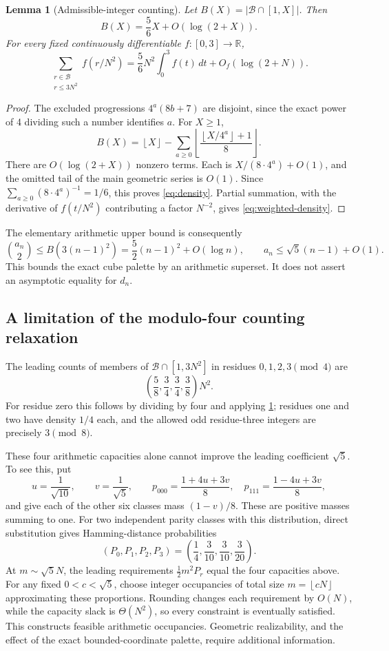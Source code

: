 \documentclass[11pt,letterpaper]{article}
\newtheorem{lemma}[theorem]{Lemma}
\theoremstyle{definition}
\newcommand{\RR}{\mathbb R}
\newcommand{\floor}[1]{\left\lfloor #1\right\rfloor}
\newcommand{\calB}{\mathcal B}
\begin{document}
\begin{lemma}[Admissible-integer counting]
\label{lem:count}
Let \(B(X)=|\calB\cap[1,X]|\). Then
\begin{equation}
 B(X)=\frac56X+O(\log(2+X)).
 \label{eq:density}
\end{equation}
For every fixed continuously differentiable \(f:[0,3]\to\RR\),
\begin{equation}
 \sum_{\substack{r\in\calB\\r\le3N^2}}f(r/N^2)
 =\frac56N^2\int_0^3f(t)\,dt+O_f(\log(2+N)).
 \label{eq:weighted-density}
\end{equation}
\end{lemma}
\begin{proof}
The excluded progressions \(4^a(8b+7)\) are disjoint, since the exact
power of 4 dividing such a number identifies \(a\). For \(X\ge1\),
\[
 B(X)=\floor X-
 \sum_{a\ge0}
 \floor{\frac{\floor{X/4^a}+1}{8}}.
\]
There are \(O(\log(2+X))\) nonzero terms. Each is
\(X/(8\cdot4^a)+O(1)\), and the omitted tail of the main geometric
series is \(O(1)\). Since
\(\sum_{a\ge0}(8\cdot4^a)^{-1}=1/6\), this proves
\cref{eq:density}. Partial summation, with the derivative of
\(f(t/N^2)\) contributing a factor \(N^{-2}\), gives
\cref{eq:weighted-density}.
\end{proof}

The elementary arithmetic upper bound is consequently
\[
 \binom{a_n}{2}\le B(3(n-1)^2)
 =\frac52(n-1)^2+O(\log n),
 \qquad a_n\le\sqrt5(n-1)+O(1).
\]
This bounds the exact cube palette by an arithmetic superset. It does
not assert an asymptotic equality for \(d_n\).

\subsection{A limitation of the modulo-four counting relaxation}
The leading counts of members of \(\calB\cap[1,3N^2]\) in residues
\(0,1,2,3\pmod4\) are
\[
 \left(\frac58,\frac34,\frac34,\frac38\right)N^2.
\]
For residue zero this follows by dividing by four and applying
\cref{lem:count}; residues one and two have density \(1/4\) each,
and the allowed odd residue-three integers are precisely \(3\pmod8\).

These four arithmetic capacities alone cannot improve the leading
coefficient \(\sqrt5\). To see this, put
\[
 u=\frac1{\sqrt{10}},\qquad v=\frac1{\sqrt5},\qquad
 p_{000}=\frac{1+4u+3v}{8},\quad
 p_{111}=\frac{1-4u+3v}{8},
\]
and give each of the other six classes mass \((1-v)/8\).
These are positive masses summing to one. For two independent
parity classes with this distribution, direct substitution gives
Hamming-distance probabilities
\[
 (P_0,P_1,P_2,P_3)=
 \left(\frac14,\frac3{10},\frac3{10},\frac3{20}\right).
\]
At \(m\sim\sqrt5N\), the leading requirements
\(\tfrac12m^2P_r\) equal the four capacities above. For any fixed
\(0<c<\sqrt5\), choose integer occupancies of total size
\(m=\floor{cN}\) approximating these proportions. Rounding changes
each requirement by \(O(N)\), while the capacity slack is
\(\Theta(N^2)\), so every constraint is eventually satisfied.
This constructs feasible arithmetic occupancies. Geometric
realizability, and the effect of the exact bounded-coordinate palette,
require additional information.
\end{document}
